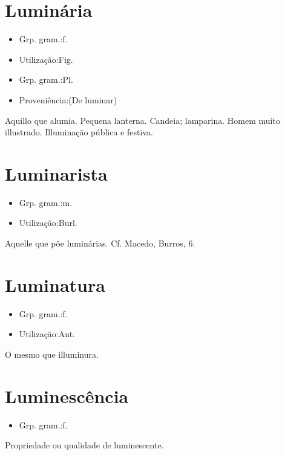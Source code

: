\section{Luminária}
\begin{itemize}
\item {Grp. gram.:f.}
\end{itemize}
\begin{itemize}
\item {Utilização:Fig.}
\end{itemize}
\begin{itemize}
\item {Grp. gram.:Pl.}
\end{itemize}
\begin{itemize}
\item {Proveniência:(De \textunderscore luminar\textunderscore )}
\end{itemize}
Aquillo que alumia.
Pequena lanterna.
Candeia; lamparina.
Homem muito illustrado.
Illuminação pública e festiva.
\section{Luminarista}
\begin{itemize}
\item {Grp. gram.:m.}
\end{itemize}
\begin{itemize}
\item {Utilização:Burl.}
\end{itemize}
Aquelle que põe luminárias. Cf. Macedo, \textunderscore Burros\textunderscore , 6.
\section{Luminatura}
\begin{itemize}
\item {Grp. gram.:f.}
\end{itemize}
\begin{itemize}
\item {Utilização:Ant.}
\end{itemize}
O mesmo que \textunderscore illuminura\textunderscore .
\section{Luminescência}
\begin{itemize}
\item {Grp. gram.:f.}
\end{itemize}
Propriedade ou qualidade de luminescente.

